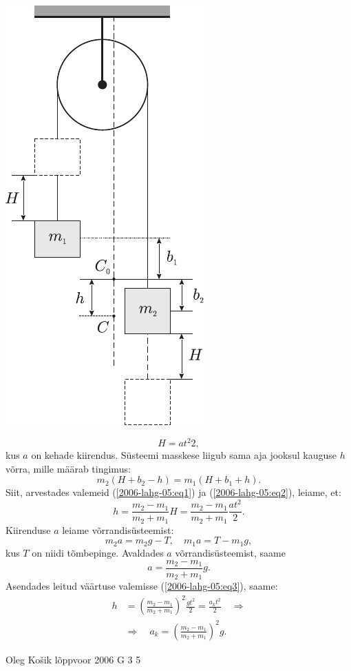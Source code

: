 \documentclass[11pt, twoside]{article}
\begin{document}
{{\begin{center}
	\includegraphics[width=0.4\linewidth]{2006-lahg-05-lah}
\end{center}

\begin{equation} \label{2006-lahg-05:eq2}
H = at^2 2,
\end{equation}
kus $a$ on kehade kiirendus. Süsteemi masskese liigub sama aja jooksul kauguse $h$ võrra, mille määrab tingimus:
\[
m_2 (H + b_2 - h) = m_1 (H + b_1 + h).
\]
Siit, arvestades valemeid (\ref{2006-lahg-05:eq1}) ja (\ref{2006-lahg-05:eq2}), leiame, et:
\begin{equation} \label{2006-lahg-05:eq3}
h=\frac{m_{2}-m_{1}}{m_{2}+m_{1}} H=\frac{m_{2}-m_{1}}{m_{2}+m_{1}} \frac{a t^{2}}{2}.
\end{equation}
Kiirenduse $a$ leiame võrrandisüsteemist: 
\[
m_2a = m_2g - T,\quad m_1a = T - m_1g,
\]
kus $T$ on niidi tõmbepinge. Avaldades $a$ võrrandisüsteemist, saame
\[
a=\frac{m_{2}-m_{1}}{m_{2}+m_{1}} g.
\]
Asendades leitud väärtuse valemisse (\ref{2006-lahg-05:eq3}), saame:
\[
\begin{aligned}
h&=\left(\frac{m_{2}-m_{1}}{m_{2}+m_{1}}\right)^{2} \frac{g t^{2}}{2}=\frac{a_{k} t^{2}}{2} \quad \Rightarrow \\ 
&\Rightarrow \quad a_{k}=\left(\frac{m_{2}-m_{1}}{m_{2}+m_{1}}\right)^{2} g.
\end{aligned}
\]
\fi
}

{Oleg Košik} %
{lõppvoor} %
{2006} %
{G 3} %
{5} %
{

}}
\end{document}
